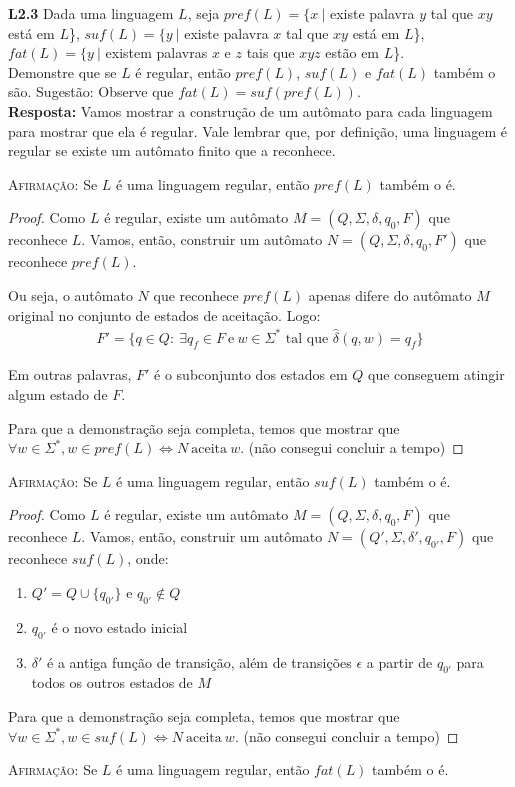 
\noindent \textbf{L2.3} Dada uma linguagem $L$, seja $pref(L) = \{x \ |$ existe palavra $y$ tal que $xy$ está em $L$\}, $suf(L) = \{y \ |$ existe palavra $x$ tal que $xy$ está em $L$\}, $fat(L) = \{y \ |$ existem palavras $x$ e $z$ tais que $xyz$ estão em $L$\}.\\
Demonstre que se $L$ é regular, então $pref(L)$, $suf(L)$ e $fat(L)$ também o são. Sugestão: Observe que $fat(L) = suf(pref(L))$.\\[3pt]
\textbf{Resposta:} Vamos mostrar a construção de um autômato para cada linguagem para mostrar que ela é regular. Vale lembrar que, por definição, uma linguagem é regular se existe um autômato finito que a reconhece.

\textsc{Afirmação:} Se $L$ é uma linguagem regular, então $pref(L)$ também o é.
\begin{proof}
Como $L$ é regular, existe um autômato $M = (Q, \Sigma, \delta, q_0, F)$ que reconhece $L$. Vamos, então, construir um autômato $N = (Q, \Sigma, \delta, q_0, F')$ que reconhece $pref(L)$.

Ou seja, o autômato $N$ que reconhece $pref(L)$ apenas difere do autômato $M$ original no conjunto de estados de aceitação. Logo:
\begin{align*}
    F' = \{q \in Q: \ \exists q_f \in F \ \text{e} \ w \in \Sigma^* \text{\ tal que\ } \hat{\delta}(q, w) = q_f \}
\end{align*}

Em outras palavras, $F'$ é o subconjunto dos estados em $Q$ que conseguem atingir algum estado de $F$.

Para que a demonstração seja completa, temos que mostrar que $\forall w \in \Sigma^*, w \in pref(L) \iff N \ \text{aceita} \ w$. (não consegui concluir a tempo)
\end{proof}

\textsc{Afirmação:} Se $L$ é uma linguagem regular, então $suf(L)$ também o é.
\begin{proof}
Como $L$ é regular, existe um autômato $M = (Q, \Sigma, \delta, q_0, F)$ que reconhece $L$. Vamos, então, construir um autômato $N = (Q', \Sigma, \delta', q_{0'}, F)$ que reconhece $suf(L)$, onde:

\begin{enumerate}[label=\textbf{(\arabic*)}]
    \item $Q' = Q \cup \{q_{0'}\}$ e $q_{0'} \notin Q$
    \item $q_{0'}$ é o novo estado inicial
    \item $\delta'$ é a antiga função de transição, além de transições $\epsilon$ a partir de $q_{0'}$ para todos os outros estados de $M$
\end{enumerate}

Para que a demonstração seja completa, temos que mostrar que $\forall w \in \Sigma^*, w \in suf(L) \iff N \ \text{aceita} \ w$. (não consegui concluir a tempo)
\end{proof}
\textsc{Afirmação:} Se $L$ é uma linguagem regular, então $fat(L)$ também o é.\\[6pt]